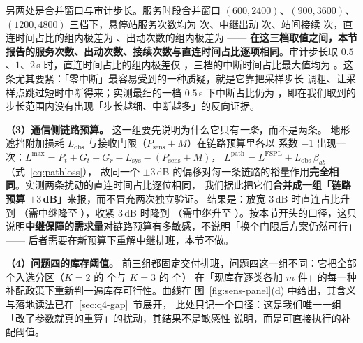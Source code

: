 另两处是合并窗口与审计步长。服务时段合并窗口 $(600,2400)$、$(900,3600)$、
$(1200,4800)$ 三档下，悬停站服务次数均为 \mtQthreeMergeServices 次、中继出动
\mtQthreeMergeOutings 次、站间接续 \mtQthreeMergeChained 次，直连时间占比的组内极差为
\mtQthreeMergeDirectRange、出动次数的组内极差为 \mtQthreeMergeOutingRange——
\textbf{在这三档取值之间，本节报告的服务次数、出动次数、接续次数与直连时间占比逐项相同}。审计步长取 $0.5$、$1$、$2$\,s
时，直连时间占比的组内极差仅 \mtQthreeDtDirectRange，三档的中断时间占比最大值均为
\mtQthreeDtGapMax。这条尤其要紧：「零中断」最容易受到的一种质疑，就是它靠把采样步长
调粗、让采样点跳过短时中断得来；实测最细的一档 $0.5$\,s 下中断占比仍为
\mtQthreeDtGapMax，即在我们取到的步长范围内没有出现「步长越细、中断越多」的反向证据。

\textbf{（3）通信侧链路预算。}\label{sec:sens-comm} 这一组要先说明为什么它只有\emph{一条}，而不是两条。
地形遮挡附加损耗 $L_{\mathrm{obs}}$ 与接收门限（$P_{\mathrm{sens}}+M$）在链路预算里各以
系数 $-1$ 出现一次：$L^{\max}=P_t+G_t+G_r-L_{\mathrm{sys}}-(P_{\mathrm{sens}}+M)$，
$L^{\mathrm{path}}=L^{\mathrm{FSPL}}+L_{\mathrm{obs}}\,\beta_{ab}$（式~\eqref{eq:pathloss}），
故同一个 $\pm3$\,dB
的偏移对每一条链路的裕量作用\textbf{完全相同}。实测两条扰动的直连时间占比逐位相同，
我们据此把它们\textbf{合并成一组「链路预算 $\pm3$\,dB」}来报，而不冒充两次独立验证。
结果是：放宽 $3$\,dB 时直连占比升到 \mtQthreeCommLoDirect（需中继降至
\mtQthreeCommLoRelay），收紧 $3$\,dB 时降到 \mtQthreeCommHiDirect（需中继升至
\mtQthreeCommHiRelay）。按本节开头的口径，这只
说明\textbf{中继保障的需求量}对链路预算有多敏感，不说明「换个门限后方案仍然可行」——
后者需要在新预算下重解中继排班，本节不做。

\textbf{（4）问题四的库存阈值。} 前三组都固定交付排班，问题四这一组不同：它把全部
\mtQfourPartitions 个入选分区（$K=2$ 的 \mtQfourPartKTwo 个与 $K=3$ 的 \mtQfourPartKThree 个）
在「现库存逐类各加 $m$ 件」的每一种补配政策下重新判一遍库存可行性。曲线在
图~\ref{fig:sens-panel}(d) 中给出，其含义与落地读法已在~\ref{sec:q4-gap}~节展开，
此处只记一个口径：这是我们唯一一组「改了参数就真的重算」的扰动，其结果不是敏感性
说明，而是可直接执行的补配阈值。


